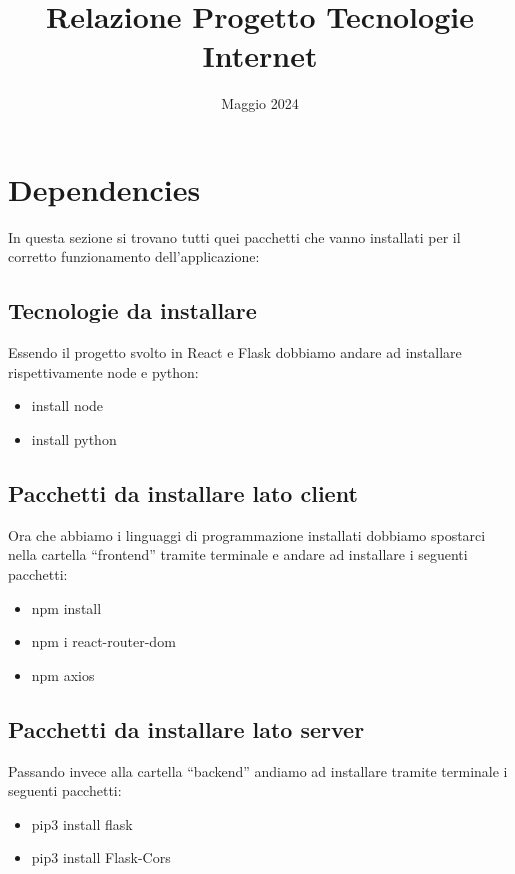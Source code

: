 \documentclass{article}
\title{Relazione Progetto Tecnologie Internet}
\author{ }
\date{Maggio 2024}
\begin{document}
\maketitle
\tableofcontents



\section{Dependencies}
In questa sezione si trovano tutti quei pacchetti che vanno installati per il corretto funzionamento dell’applicazione:

\subsection{Tecnologie da installare}
Essendo il progetto svolto in React e Flask dobbiamo andare ad installare rispettivamente node e python:
\begin{itemize}
    \item install node
    \item install python
\end{itemize}

\subsection{Pacchetti da installare lato client}
Ora che abbiamo i linguaggi di programmazione installati dobbiamo spostarci nella cartella “frontend” tramite terminale e andare ad installare i seguenti pacchetti:
\begin{itemize}
    \item npm install
    \item npm i react-router-dom
    \item npm axios
\end{itemize}

\subsection{Pacchetti da installare lato server}
Passando invece alla cartella “backend” andiamo ad installare tramite terminale i seguenti pacchetti:
\begin{itemize}
    \item pip3 install flask
    \item pip3 install Flask-Cors
\end{itemize}
\end{document}

